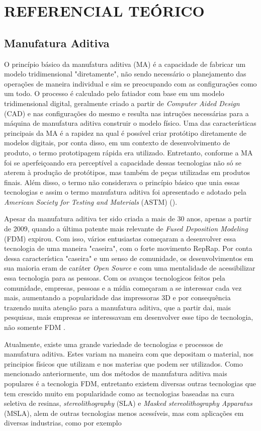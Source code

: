 \chapter{REFERENCIAL TEÓRICO}

\section{Manufatura Aditiva}
O princípio básico da manufatura aditiva (MA) é a 
capacidade de fabricar um modelo tridimensional "diretamente", não sendo
necessário o planejamento das operações de maneira individual e sim se preocupando
com as configurações como um todo.
O processo é calculado pelo fatiador com base em um modelo tridimensional digital,
geralmente criado a partir de \textit{Computer Aided Design} (CAD) e nas configurações do mesmo
e resulta nas intruções necessárias para a máquina de manufatura aditiva construir o modelo físico.
Uma das características 
principais da MA é a rapidez na qual é possível criar protótipo
diretamente de modelos digitais, por conta disso, em um contexto 
de desenvolvimento de produto, o termo prototipagem rápida era 
utilizado. Entretanto, conforme a MA foi se aperfeiçoando era 
perceptível a capacidade dessas tecnologias não só se aterem à 
produção de protótipos, mas também de peças utilizadas em 
produtos finais. Além disso, o termo não considerava o princípio 
básico que unia essas tecnologias e assim o termo manufatura 
aditiva foi apresentado e adotado pela \textit{American Society for 
Testing and Materials} (ASTM) \citeauthor{gibson15} (\citeyear{gibson15}).

Apesar da manufatura aditiva ter sido criada a mais de 30 anos, apenas
a partir de 2009, quando a última patente mais relevante de \textit{Fused Deposition Modeling} (FDM)
expirou. Com isso, vários entusiastas começaram a desenvolver essa tecnologia de uma
maneira "caseira", com o forte movimento RepRap. Por conta dessa característica
"caseira" e um senso de comunidade, os desenvolvimentos em sua maioria eram
de caráter \textit{Open Source} e com uma mentalidade de acessibilizar essa tecnologia para as pessoas.
Com os avanços tecnologicos feitos pela comunidade, empresas, pessoas e a mídia começaram
a se interessar cada vez mais, aumentando a popularidade das impressoras 3D e por consequência
trazendo muita atenção para a manufatura aditiva, que a partir dai, mais pesquisas, mais
empresas se interessavam em desenvolver esse tipo de tecnologia, não somente FDM \cite{attaran17}.

Atualmente, existe uma grande variedade de tecnologias e processos de manufatura aditiva.
Estes variam na maneira com que depositam o material, nos principios físicos que utilizam e nos materias
que podem ser utilizados. Como mencionado anteriormente, um dos métodos de manufatura aditiva mais populares
é a tecnologia FDM, entretanto existem diversas outras tecnologias que tem crescido muito em popularidade
como as tecnologias baseadas na cura seletiva de resinas, \textit{stereolithography} (SLA) e \textit{Masked stereolithography Apparatus} (MSLA),
alem de outras tecnologias menos acessíveis, mas com aplicações em diversas industrias, como por exemplo

